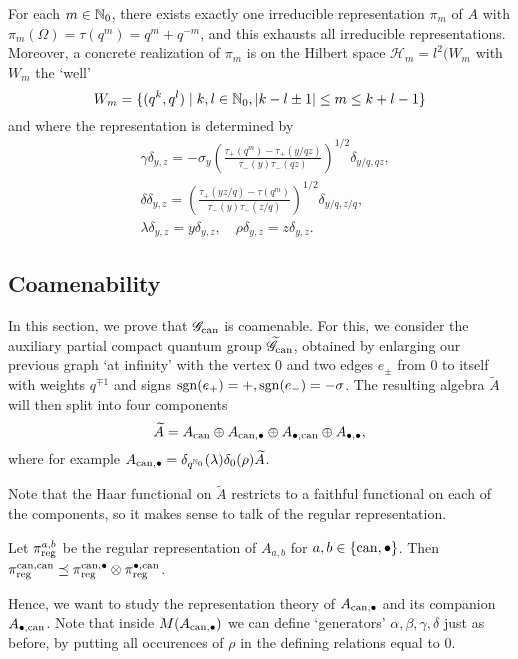 \begin{Lem} For each $m\in \mathbb{N}_0$, there exists exactly one irreducible representation $\pi_m$ of $A$ with $\pi_m(\Omega) = \tau(q^m) = q^m+q^{-m}$, and this exhausts all irreducible representations. Moreover, a concrete realization of $\pi_m$ is on the Hilbert space $\mathscr{H}_m = l^2(W_{m}$ with $W_m$ the `well' \[W_m = \{(q^k,q^l)\mid k,l\in \mathbb{N}_0, |k-l\pm1|\leq m \leq k+l-1\}\] and where the representation is determined by \begin{align*} &\gamma \delta_{y,z} = -\sigma_y \left(\frac{\tau_+(q^m)-\tau_+(y/qz)}{\tau_-(y)\tau_-(qz)}\right)^{1/2} \delta_{y/q,qz},\\ &\delta \delta_{y,z} = \left(\frac{\tau_+(yz/q)-\tau(q^m)}{\tau_-(y)\tau_-(z/q)}\right)^{1/2} \delta_{y/q,z/q},\\ & \lambda \delta_{y,z} = y\delta_{y,z},\quad \rho \delta_{y,z} = z \delta_{y,z}.\end{align*} 
\end{Lem} 

\subsection{Coamenability}

In this section, we prove that $\mathscr{G}_{\operatorname{\mathrm{can}}}$ is coamenable. For this, we consider the auxiliary partial compact quantum group $\widetilde{\mathscr{G}}_{\operatorname{\mathrm{can}}}$, obtained by enlarging our previous graph `at infinity' with the vertex $0$ and two edges $e_{\pm}$ from 0 to itself with weights $q^{\mp 1}$ and signs $\operatorname{\mathrm{sgn}}(e_+)=+,\operatorname{\mathrm{sgn}}(e_-)=-\sigma$. The resulting algebra $\widetilde{A}$ will then split into four components \[\widetilde{A} = A_{\operatorname{\mathrm{can}}} \oplus A_{\operatorname{\mathrm{can}},\bullet} \oplus A_{\bullet,\operatorname{\mathrm{can}}} \oplus A_{\bullet,\bullet},\] where for example $A_{\operatorname{\mathrm{can}},\bullet} = \delta_{q^{\mathbb{N}_0}}(\lambda)\delta_0(\rho) \widetilde{A}$. 

Note that the Haar functional on $\widetilde{A}$ restricts to a faithful functional on each of the components, so it makes sense to talk of the regular representation. 

\begin{Lem} Let $\pi_{\operatorname{\mathrm{reg}}}^{a,b}$ be the regular representation of $A_{a,b}$ for $a,b\in \{\operatorname{\mathrm{can}},\bullet\}$. Then $\pi_{\operatorname{\mathrm{reg}}}^{\operatorname{\mathrm{can}},\operatorname{\mathrm{can}}} \preceq \pi_{\operatorname{\mathrm{reg}}}^{\operatorname{\mathrm{can}},\bullet}\otimes \pi_{\operatorname{\mathrm{reg}}}^{\bullet,\operatorname{\mathrm{can}}}$. 
\end{Lem} 

Hence, we want to study the representation theory of $A_{\operatorname{\mathrm{can}},\bullet}$ and its companion $A_{\bullet,\operatorname{\mathrm{can}}}$. Note that inside $M(A_{\operatorname{\mathrm{can}},\bullet})$ we can define `generators' $\alpha,\beta,\gamma,\delta$ just as before, by putting all occurences of $\rho$ in the defining relations equal to $0$. 

